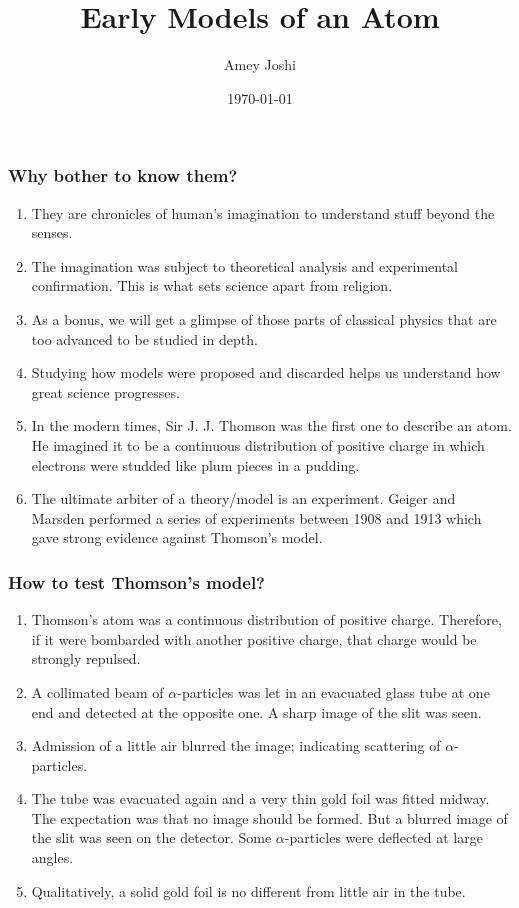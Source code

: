 \documentclass{beamer}
\title{Early Models of an Atom}
\author{Amey Joshi}
\date{\today}
\begin{document}
\begin{frame}
\titlepage
\end{frame}

\begin{frame}
\frametitle{Why bother to know them?}
\begin{enumerate}
\item They are chronicles of human's imagination to understand stuff beyond the
senses.
\item The imagination was subject to theoretical analysis and experimental 
confirmation. This is what sets science apart from religion.
\item As a bonus, we will get a glimpse of those parts of classical physics that 
are too advanced to be studied in depth.
\item Studying how models were proposed and discarded helps us understand how
great science progresses.
\item In the modern times, Sir J. J. Thomson was the first one to describe an 
atom. He imagined it to be a continuous distribution of positive charge in which
electrons were studded like plum pieces in a pudding.
\item The ultimate arbiter of a theory/model is an experiment. Geiger and 
Marsden performed a series of experiments between 1908 and 1913 which gave 
strong evidence against Thomson's model. 
\end{enumerate}
\end{frame}

\begin{frame}
\frametitle{How to test Thomson's model?}
\begin{enumerate}
\item Thomson's atom was a continuous distribution of positive charge. 
Therefore, if it were bombarded with another positive charge, that charge would
be strongly repulsed.
\item A collimated beam of $\alpha$-particles was let in an evacuated glass tube 
at one end and detected at the opposite one. A sharp image of the slit was seen.
\item Admission of a little air blurred the image; indicating scattering of 
$\alpha$-particles.
\item The tube was evacuated again and a very thin gold foil was fitted midway.
The expectation was that no image should be formed. But a blurred image of the
slit was seen on the detector. Some $\alpha$-particles were deflected at large
angles.
\item Qualitatively, a solid gold foil is no different from little air in the 
tube.
\end{enumerate}
\end{frame}
\end{document}
